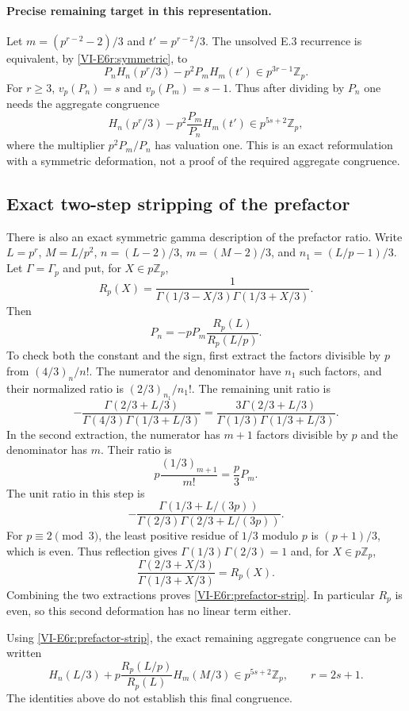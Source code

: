 \documentclass[11pt,letterpaper]{article}
\numberwithin{equation}{section}
\begin{document}
\paragraph{Precise remaining target in this representation.}
Let $m=(p^{r-2}-2)/3$ and $t'=p^{r-2}/3$. The unsolved E.3
recurrence is equivalent, by \eqref{VI-E6r:symmetric}, to
\[
 P_nH_n(p^r/3)-p^2P_mH_m(t')\in p^{3r-1}\mathbb Z_p.
\]
For $r\ge3$, $v_p(P_n)=s$ and $v_p(P_m)=s-1$.
Thus after dividing by $P_n$ one needs the aggregate congruence
\[
 H_n(p^r/3)-p^2\frac{P_m}{P_n}H_m(t')
 \in p^{5s+2}\mathbb Z_p,
\]
where the multiplier $p^2P_m/P_n$ has valuation one.
This is an exact reformulation with a symmetric deformation,
not a proof of the required aggregate congruence.

\subsection{Exact two-step stripping of the prefactor}
There is also an exact symmetric gamma description of the prefactor
ratio. Write $L=p^r$, $M=L/p^2$, $n=(L-2)/3$, $m=(M-2)/3$,
and $n_1=(L/p-1)/3$. Let $\Gamma=\Gamma_p$ and put, for
$X\in p\mathbb Z_p$,
\[
 R_p(X)=\frac1{\Gamma(1/3-X/3)\Gamma(1/3+X/3)}.
\]
Then
\begin{equation}\label{VI-E6r:prefactor-strip}
 P_n=-pP_m\frac{R_p(L)}{R_p(L/p)}.
\end{equation}
To check both the constant and the sign, first extract the factors
divisible by $p$ from $(4/3)_n/n!$. The numerator and denominator
have $n_1$ such factors, and their normalized ratio is
$(2/3)_{n_1}/n_1!$. The remaining unit ratio is
\[
 -\frac{\Gamma(2/3+L/3)}{\Gamma(4/3)\Gamma(1/3+L/3)}
 =\frac{3\Gamma(2/3+L/3)}
 {\Gamma(1/3)\Gamma(1/3+L/3)}.
\]
In the second extraction, the numerator has $m+1$ factors divisible
by $p$ and the denominator has $m$. Their ratio is
\[
 p\frac{(1/3)_{m+1}}{m!}=\frac p3P_m.
\]
The unit ratio in this step is
\[
 -\frac{\Gamma(1/3+L/(3p))}
 {\Gamma(2/3)\Gamma(2/3+L/(3p))}.
\]
For $p\equiv2\pmod3$, the least positive residue of $1/3$ modulo
$p$ is $(p+1)/3$, which is even. Thus reflection gives
$\Gamma(1/3)\Gamma(2/3)=1$ and, for $X\in p\mathbb Z_p$,
\[
 \frac{\Gamma(2/3+X/3)}{\Gamma(1/3+X/3)}=R_p(X).
\]
Combining the two extractions proves
\eqref{VI-E6r:prefactor-strip}. In particular $R_p$ is even, so this
second deformation has no linear term either.

Using \eqref{VI-E6r:prefactor-strip}, the exact remaining aggregate
congruence can be written
\[
 H_n(L/3)+p\frac{R_p(L/p)}{R_p(L)}H_m(M/3)
 \in p^{5s+2}\mathbb Z_p,\qquad r=2s+1.
\]
The identities above do not establish this final congruence.
\end{document}
